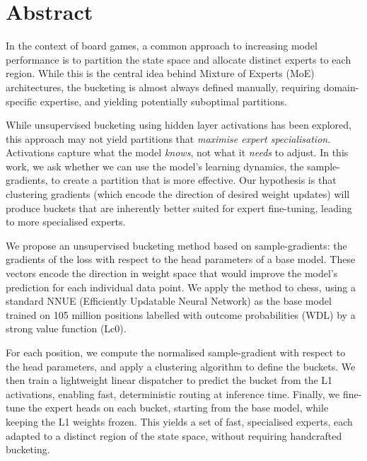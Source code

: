 \chapter{Abstract}\label{ch:abstract}

In the context of board games, a common approach to increasing model performance is to partition the state space and allocate distinct experts to each region. While this is the central idea behind Mixture of Experts (MoE) architectures, the bucketing is almost always defined manually, requiring domain-specific expertise, and yielding potentially suboptimal partitions.

While unsupervised bucketing using hidden layer activations has been explored, this approach may not yield partitions that \emph{maximise expert specialisation}. Activations capture what the model \emph{knows}, not what it \emph{needs} to adjust. In this work, we ask whether we can use the model's learning dynamics, the sample-gradients, to create a partition that is more effective. Our hypothesis is that clustering gradients (which encode the direction of desired weight updates) will produce buckets that are inherently better suited for expert fine-tuning, leading to more specialised experts.

We propose an unsupervised bucketing method based on sample-gradients: the gradients of the loss with respect to the head parameters of a base model. These vectors encode the direction in weight space that would improve the model's prediction for each individual data point. We apply the method to chess, using a standard NNUE (Efficiently Updatable Neural Network) as the base model trained on 105 million positions labelled with outcome probabilities (WDL) by a strong value function (Lc0).

For each position, we compute the normalised sample-gradient with respect to the head parameters, and apply a clustering algorithm to define the buckets. We then train a lightweight linear dispatcher to predict the bucket from the L1 activations, enabling fast, deterministic routing at inference time. Finally, we fine-tune the expert heads on each bucket, starting from the base model, while keeping the L1 weights frozen. This yields a set of fast, specialised experts, each adapted to a distinct region of the state space, without requiring handcrafted bucketing.

